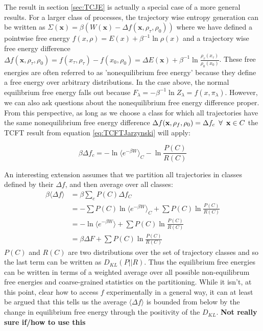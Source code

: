\documentclass[paper=a4, fontsize=10pt]{article} %
\numberwithin{equation}{section} %
\numberwithin{figure}{section} %
\numberwithin{table}{section} %
\def\tbf #1{\textbf{#1} }
\def\avg#1{\langle #1 \rangle}
\def \x {\mathbf{x} }
\begin{document}
The result in section \ref{sec:TCJE} is actually a special case of a more general results. For a larger class of processes, the trajectory wise entropy generation can be written as $\Sigma(\x) = \beta(W(\x) - \Delta f(\x, \rho_\tau, \rho_0)) $ where we have defined a pointwise free energy $f(x,\rho) = E(x) + \beta^{-1} \ln \rho(x)$ and a  trajectory wise free energy difference $\Delta f(\x, \rho_\tau, \rho_0) = f(x_\tau,\rho_\tau) - f(x_0,\rho_0) =  \Delta E(\x) + \beta^{-1} \ln \frac{\rho_\tau(x_\tau)}{\rho_0(x_0)}$. These free energies are often referred to as 'nonequilibrium free energy' because they define a free energy over arbitrary distributions. In the case above, the normal equilibrium free energy falls out because $F_\lambda = -\beta^{-1} \ln Z_\lambda = f(x, \pi_\lambda)$. However, we can also ask questions about the nonequilibrium free energy difference proper. From this perspective, as long as we choose a class for which all trajectories have the same nonequilibrium free energy difference $\Delta f(\x, \rho_f, \rho_0) = \Delta f_c \enskip\forall\enskip \x \in C$ the TCFT result from equation \ref{eq:TCFTJarzynski} will apply:

\[ \beta  \Delta f_c = - \ln \avg{ e^{-\beta W}}_C - \ln \frac{P(C)}{R(C)}  \]

An interesting extension assumes that we partition all trajectories in classes defined by their $\Delta f$, and then average over all classes:
\begin{align}
 \beta \avg{ \Delta f} &=  \beta \sum_c P(C) \Delta f_C \\
 &= -\sum P(C) \ln \avg{e^{-\beta W}}_C + \sum P(C) \ln \frac{P(C)}{R(C)} \\
&= - \ln \avg{e^{-\beta W}} + \sum P(C) \ln \frac{P(C)}{R(C)} \\
& = \beta \Delta F+ \sum P(C) \ln \frac{P(C)}{R(C)}
\end{align}
$P(C)$ and $R(C)$ are two distributions over the set of trajectory classes and so the last term can be written as $D_{KL}(P||R)$. Thus the equilibrium free energies can be written in terms of a weighted average over all possible non-equilibrum free energies and coarse-grained statistics on the partitioning. While it isn't, at this point, clear how to access $f$ experimentally in a general way, it can at least be argued that this tells us the average $\avg{\Delta f}$ is bounded from below by the change in equilibrium free energy through the positivity of the $D_{KL}$. \tbf{Not really sure if/how to use this}
\end{document}
